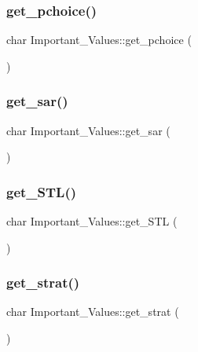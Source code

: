 \subsubsection{\texorpdfstring{get\_pchoice()}{get\_pchoice()}}
{\footnotesize\ttfamily char Important\+\_\+\+Values\+::get\+\_\+pchoice (\begin{DoxyParamCaption}{ }\end{DoxyParamCaption})\hspace{0.3cm}{\ttfamily [inline]}}

\mbox{\label{class_important___values_ab44c0d6647b0a611f8d1bb017cd43635}} 
\subsubsection{\texorpdfstring{get\_sar()}{get\_sar()}}
{\footnotesize\ttfamily char Important\+\_\+\+Values\+::get\+\_\+sar (\begin{DoxyParamCaption}{ }\end{DoxyParamCaption})\hspace{0.3cm}{\ttfamily [inline]}}

\mbox{\label{class_important___values_aa5c45bac02d2b75175ab647515f8db81}} 
\subsubsection{\texorpdfstring{get\_STL()}{get\_STL()}}
{\footnotesize\ttfamily char Important\+\_\+\+Values\+::get\+\_\+\+S\+TL (\begin{DoxyParamCaption}{ }\end{DoxyParamCaption})\hspace{0.3cm}{\ttfamily [inline]}}

\mbox{\label{class_important___values_aaddb4a0a6e6804bc316852791271d517}} 
\subsubsection{\texorpdfstring{get\_strat()}{get\_strat()}}
{\footnotesize\ttfamily char Important\+\_\+\+Values\+::get\+\_\+strat (\begin{DoxyParamCaption}{ }\end{DoxyParamCaption})\hspace{0.3cm}{\ttfamily [inline]}}

